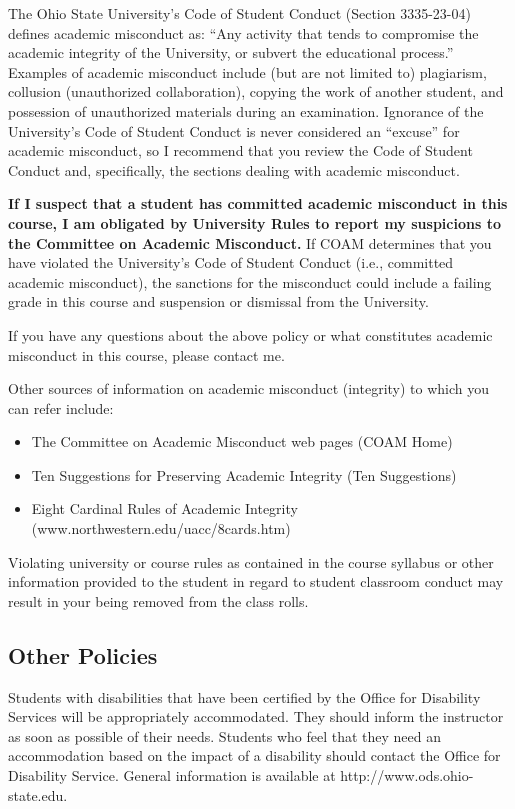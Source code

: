 \documentclass[12pt]{article}
\begin{document}
The Ohio State University’s Code of Student Conduct (Section 3335-23-04) defines academic misconduct as: ``Any activity that tends to compromise the academic integrity of the University, or subvert the educational process.''
Examples of academic misconduct include (but are not limited to) plagiarism, collusion (unauthorized collaboration), copying the work of another student, and possession of unauthorized materials during an examination.
Ignorance of the University’s Code of Student Conduct is never considered an ``excuse'' for academic misconduct, so I recommend that you review the Code of Student Conduct and, specifically, the sections dealing with academic misconduct.

\textbf{If I suspect that a student has committed academic misconduct in this course, I am obligated by University Rules to report my suspicions to the Committee on Academic Misconduct.}
If COAM determines that you have violated the University’s Code of Student Conduct (i.e., committed academic misconduct), the sanctions for the misconduct could include a failing grade in this course and suspension or dismissal from the University.

If you have any questions about the above policy or what constitutes academic misconduct in this course, please contact me.

Other sources of information on academic misconduct (integrity) to which you can refer include:
\begin{itemize}
    \item The Committee on Academic Misconduct web pages (COAM Home)
    \item Ten Suggestions for Preserving Academic Integrity (Ten Suggestions)
    \item Eight Cardinal Rules of Academic Integrity (www.northwestern.edu/uacc/8cards.htm)
\end{itemize}

Violating university or course rules as contained in the course syllabus or other information provided to the student in regard to student classroom conduct may result in your being removed from the class rolls.

\subsection*{Other Policies}

Students with disabilities that have been certified by the Office for Disability Services will be appropriately accommodated.
They should inform the instructor as soon as possible of their needs.
Students who feel that they need an accommodation based on the impact of a disability should contact the Office for Disability Service.
General information is available at http://www.ods.ohio-state.edu.
\end{document}
